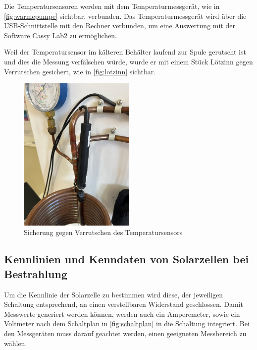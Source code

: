 \documentclass[12pt,english,ngerman]{scrartcl}
\begin{document}
Die Temperatursensoren werden mit dem Temperaturmessgerät, wie in
\autoref{fig:warmepumpe} sichtbar, verbunden. Das Temperaturmessgerät wird über
die USB-Schnittstelle mit den Rechner verbunden, um eine Auswertung mit der
Software Cassy Lab2 zu ermöglichen.

Weil der Temperatursensor im kälteren Behälter laufend zur Spule gerutscht ist
und dies die Messung verfälschen würde, wurde er mit einem Stück Lötzinn gegen
Verrutschen gesichert, wie in \autoref{fig:lotzinn} sichtbar.

\begin{figure}[H]
	\begin{center}
		\includegraphics[width =0.5\textwidth]{./figures/lotzinn.png}
	\end{center}
	\caption{Sicherung gegen Verrutschen des Temperatursensors
	}\label{fig:lotzinn}
\end{figure}

\subsection{Kennlinien und Kenndaten von Solarzellen bei Bestrahlung}

Um die Kennlinie der Solarzelle zu bestimmen wird diese, der jeweiligen
Schaltung entsprechend, an einen verstellbaren Widerstand geschlossen. Damit
Messwerte generiert werden können, werden auch ein Amperemeter, sowie ein
Voltmeter nach dem Schaltplan in \autoref{fig:schaltplan} in die Schaltung
integriert. Bei den Messgeräten muss darauf geachtet werden, einen geeigneten
Messbereich zu wählen.
\end{document}
